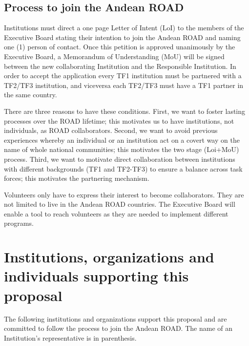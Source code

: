 \documentclass[12pt]{article}
\begin{document}
\subsection*{Process to join the Andean ROAD}

Institutions must direct a one page Letter of Intent (LoI) to the
members of the Executive Board stating their intention to join the
Andean ROAD and naming one (1) person of contact. Once this petition
is approved unanimously by the Executive Board, a Memorandum of
Understanding (MoU) will be signed between the new collaborating Institution
and the Responsible Institution. In order to accept the application
every TF1 institution must be partnered with a TF2/TF3 institution,
and viceversa each TF2/TF3 must have a TF1 partner in the same
country. 

There are three reasons to have these conditions. First, we want to
foster lasting processes over the ROAD lifetime; this motivates us to
have institutions, not individuals, as ROAD collaborators. Second, we want
to avoid previous experiences whereby an individual or an institution
act on a covert way on the name of whole national communities; this
motivates the two stage (Loi+MoU) process. Third, we want to motivate
direct collaboration between institutions with different backgrounds
(TF1 and TF2-TF3) to ensure a balance across task forces; this
motivates the partnering mechanism.  

Volunteers only have to express their interest to become
collaborators. They are not limited to live in the Andean ROAD
countries. The Executive Board will enable a tool to reach volunteers
as they are needed to implement different programs.  


\appendixpage
\appendix
\section{Institutions, organizations and individuals supporting this proposal}

The following institutions and organizations support this proposal and
are committed to follow the process to join the Andean ROAD. The name
of an Institution’s representative is in parenthesis. 
\end{document}
